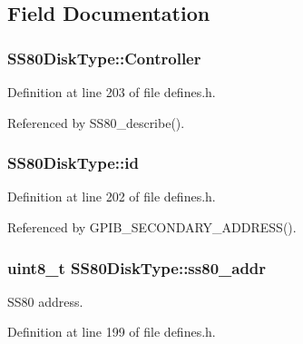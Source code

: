 \subsection{Field Documentation}
\subsubsection[{\texorpdfstring{Controller}{Controller}}]{ S\+S80\+Disk\+Type\+::\+Controller}\hypertarget{structSS80DiskType_a2fe71dc8a453df2e8cde8e8dded1bb63}{}\label{structSS80DiskType_a2fe71dc8a453df2e8cde8e8dded1bb63}


Definition at line 203 of file defines.\+h.



Referenced by S\+S80\+\_\+describe().

\subsubsection[{\texorpdfstring{id}{id}}]{ S\+S80\+Disk\+Type\+::id}\hypertarget{structSS80DiskType_a051107cea479ec682a317e0c44ca5f51}{}\label{structSS80DiskType_a051107cea479ec682a317e0c44ca5f51}


Definition at line 202 of file defines.\+h.



Referenced by G\+P\+I\+B\+\_\+\+S\+E\+C\+O\+N\+D\+A\+R\+Y\+\_\+\+A\+D\+D\+R\+E\+S\+S().

\subsubsection[{\texorpdfstring{ss80\+\_\+addr}{ss80_addr}}]{\setlength{\rightskip}{0pt plus 5cm}uint8\+\_\+t S\+S80\+Disk\+Type\+::ss80\+\_\+addr}\hypertarget{structSS80DiskType_af41bd36ae711bae5aaa86722798ea281}{}\label{structSS80DiskType_af41bd36ae711bae5aaa86722798ea281}


S\+S80 address. 



Definition at line 199 of file defines.\+h.



